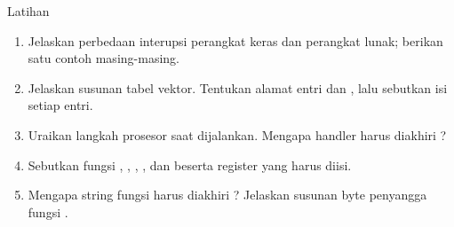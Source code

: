 \documentclass[aspectratio=169,11pt]{beamer}
\begin{document}
\begin{frame}{Latihan}
\small
\begin{enumerate}
    \item Jelaskan perbedaan interupsi perangkat keras dan perangkat
          lunak; berikan satu contoh masing-masing.

    \vspace{0.15em}
    \item Jelaskan susunan tabel vektor. Tentukan alamat entri
           dan , lalu sebutkan isi
          setiap entri.

    \vspace{0.15em}
    \item Uraikan langkah prosesor saat  dijalankan.
          Mengapa handler harus diakhiri ?

    \vspace{0.15em}
    \item Sebutkan fungsi  , ,
          , , dan  beserta register yang
          harus diisi.

    \vspace{0.15em}
    \item Mengapa string fungsi  harus diakhiri
          ? Jelaskan susunan byte penyangga fungsi
          .
\end{enumerate}
\end{frame}
\end{document}
